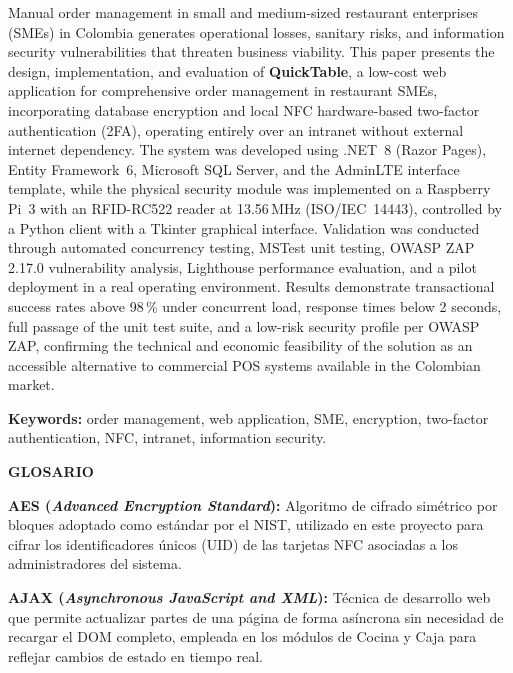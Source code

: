 Manual order management in small and medium-sized restaurant enterprises (SMEs) in Colombia 
generates operational losses, sanitary risks, and information security vulnerabilities that 
threaten business viability. This paper presents the design, implementation, and evaluation 
of \textbf{QuickTable}, a low-cost web application for comprehensive order management in 
restaurant SMEs, incorporating database encryption and local NFC hardware-based two-factor 
authentication (2FA), operating entirely over an intranet without external internet 
dependency. The system was developed using .NET~8 (Razor Pages), Entity Framework~6, 
Microsoft SQL Server, and the AdminLTE interface template, while the physical security 
module was implemented on a Raspberry Pi~3 with an RFID-RC522 reader at 13.56\,MHz 
(ISO/IEC~14443), controlled by a Python client with a Tkinter graphical interface. 
Validation was conducted through automated concurrency testing, MSTest unit testing, 
OWASP ZAP 2.17.0 vulnerability analysis, Lighthouse performance evaluation, and a pilot 
deployment in a real operating environment. Results demonstrate transactional success rates 
above 98\,\% under concurrent load, response times below 2 seconds, full passage of the 
unit test suite, and a low-risk security profile per OWASP ZAP, confirming the technical 
and economic feasibility of the solution as an accessible alternative to commercial POS 
systems available in the Colombian market.

\bigskip
\noindent\textbf{Keywords:} order management, web application, SME, encryption, 
two-factor authentication, NFC, intranet, information security.




\newpage
\thispagestyle{empty}

\begin{center}
	{\large\bfseries GLOSARIO}
\end{center}

\vspace{1cm}

\noindent
\textbf{AES (\textit{Advanced Encryption Standard}):} Algoritmo de cifrado simétrico por bloques adoptado como estándar por el NIST, utilizado en este proyecto para cifrar los identificadores únicos (UID) de las tarjetas NFC asociadas a los administradores del sistema.

\noindent
\textbf{AJAX (\textit{Asynchronous JavaScript and XML}):} Técnica de desarrollo web que permite actualizar partes de una página de forma asíncrona sin necesidad de recargar el DOM completo, empleada en los módulos de Cocina y Caja para reflejar cambios de estado en tiempo real.

